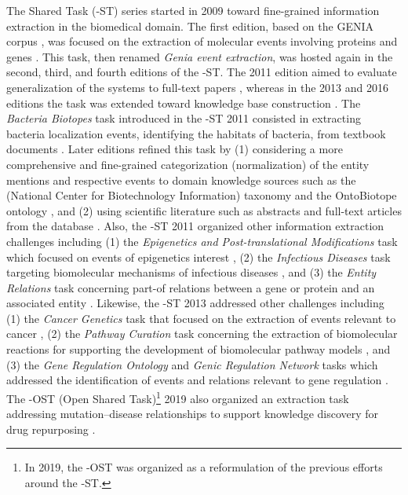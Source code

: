 The  Shared Task (-ST) series started in 2009 toward fine-grained information extraction in the biomedical domain.
The first edition, based on the GENIA corpus \parencite{ohta2002a,kim2003a,kim2008a}, was focused on the extraction of molecular events involving proteins and genes \parencite{kim2009a,kim2011b}.
This task, then renamed \textit{Genia event extraction}, was hosted again in the second, third, and fourth editions of the -ST.
The 2011 edition aimed to evaluate generalization of the systems to full-text papers \parencite{kim2011c}, whereas in the 2013 and 2016 editions the task was extended toward knowledge base construction \parencite{kim2013a,kim2015a,kim2016c}.
The \textit{Bacteria Biotopes} task introduced in the -ST 2011 consisted in extracting bacteria localization events, identifying the habitats of bacteria, from textbook documents \parencite{bossy2011a,bossy2012a}.
Later editions refined this task by (1) considering a more comprehensive and fine-grained categorization (normalization) of the entity mentions and respective events to domain knowledge sources such as the  (National Center for Biotechnology Information) taxonomy \parencite{federhen2012a} and the OntoBiotope ontology \parencite{nedellec2018a}, and (2) using scientific literature such as abstracts and full-text articles from the  database \parencite{bossy2013a,deleger2016a,bossy2019a}.
Also, the -ST 2011 \parencite{kim2011a,pyysalo2012b} organized other information extraction challenges including (1) the \textit{Epigenetics and Post-translational Modifications} task which focused on events of epigenetics interest \parencite{ohta2011a}, (2) the \textit{Infectious Diseases} task targeting biomolecular mechanisms of infectious diseases \parencite{pyysalo2011a}, and (3) the \textit{Entity Relations} task concerning part-of relations between a gene or protein and an associated entity \parencite{pyysalo2011b}.
Likewise, the -ST 2013 \parencite{nedellec2013a,pyysalo2015a,bossy2015a} addressed other challenges including (1) the \textit{Cancer Genetics} task that focused on the extraction of events relevant to cancer \parencite{pyysalo2013b}, (2) the \textit{Pathway Curation} task concerning the extraction of biomolecular reactions for supporting the development of biomolecular pathway models \parencite{ohta2013a}, and (3) the \textit{Gene Regulation Ontology} and \textit{Genic Regulation Network} tasks which addressed the identification of events and relations relevant to gene regulation \parencite{kim2013b,bossy2013b}.
The -OST (Open Shared Task)\footnote{In 2019, the -OST was organized as a reformulation of the previous efforts around the -ST.} 2019 also organized an extraction task addressing mutation--disease relationships to support knowledge discovery for drug repurposing \parencite{wang2019e}.

